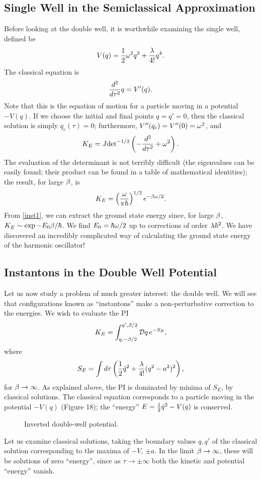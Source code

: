 \documentclass[12pt]{article}
\begin{document}
\subsection{Single Well in the Semiclassical Approximation}
Before looking at the double well, it is worthwhile examining the
single well, defined be
\[
V(q)={\frac 12}{\omega}^2q^2+{\lambda\over4!}q^4.
\]
The classical equation is
\[
{d^2\over d\tau^2}q=V'(q).
\]
Note that this is the equation of motion for a particle moving in a
potential $-V(q)$. If we choose the initial and final points $q=q'=0$,
then the classical solution is simply $q_c(\tau)=0$; furthermore,
$V''(q_c)=V''(0)={\omega}^2$, and
\[
K_E=J{\det}^{-1/2}\left(-{d^2\over d\tau^2}+{\omega}^2\right).
\]
The evaluation of the determinant is not terribly difficult (the
eigenvalues can be easily found; their product can be found in a table
of mathematical identities); the result, for large ${\beta}$, is
\[
K_E=\left({{\omega}\over\pi\hbar}\right)^{1/2}e^{-{\beta}{\omega}/2}.
\]
From \eqref{inst1}, we can extract the ground state energy since, for
large ${\beta}$, $K_E\sim\exp-E_0{\beta}/\hbar$. We find $E_0=\hbar{\omega}/2$ up to
corrections of order $\lambda\hbar^2$. We have discovered an incredibly
complicated way of calculating the ground state energy of the harmonic
oscillator!

\subsection{Instantons in the Double Well Potential}
Let us now study a problem of much greater
interest: the double well. We will see
that configurations known as ``instantons'' make a non-perturbative
correction to the energies. We wish to evaluate the PI
\[
K_E=\int_{q,-\be/2}^{q',\be/2}\DD q\,e^{-S_E},
\]
where
\[
S_E=\int d\tau\left({\frac 12}{\dot q}^2+{\lambda\over4!}(q^2-a^2)^2\right),
\]
for ${\beta}\to\infty$. As explained above, the PI is dominated by minima
of $S_E$, \ie by classical solutions. The classical equation
corresponds to a particle moving in the potential $-V(q)$
(Figure 18); the ``energy'' $E={\frac 12}{\dot q}^2-V(q)$ is conserved.

\begin{figure}[ht]
\epsfysize=5cm
\centerline{}
\caption{Inverted double-well potential.}
\end{figure}


Let us examine classical solutions, taking the boundary values $q,q'$
of the classical solution corresponding to the maxima of $-V$, $\pm
a$. In the limit ${\beta}\to\infty$, these will be solutions of zero
``energy'', since as $\tau\to\pm\infty$ both the kinetic and potential
``energy'' vanish.
\end{document}
